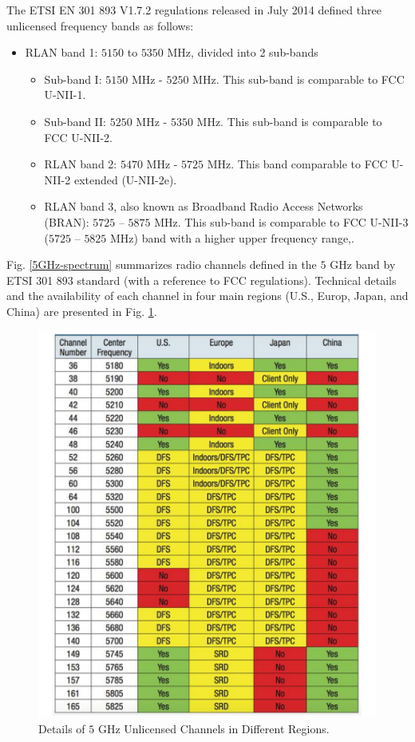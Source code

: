 The ETSI EN 301 893 V1.7.2 regulations \cite{LBT-ETSI-2014} released in July 2014 defined three unlicensed frequency bands as follows:
\begin{itemize}
\item
RLAN band 1: $5150$ to $5350$ MHz, divided into 2 sub-bands
\begin{itemize}
\item
Sub-band I: $5150$ MHz - $5250$ MHz. This sub-band is comparable to FCC U-NII-1. 
\item
Sub-band II: $5250$ MHz - $5350$ MHz. This sub-band is comparable to FCC U-NII-2.
\item
RLAN band 2: $5470$ MHz - $5725$ MHz. This band comparable to FCC U-NII-2 extended (U-NII-2e).
\item
RLAN band 3, also known as Broadband Radio Access Networks (BRAN): $5725$ – $5875$ MHz. This sub-band is comparable to FCC U-NII-3 ($5725$ – $5825$ MHz) band with a higher upper frequency range,.
\end{itemize}
\end{itemize}

Fig. \ref{5GHz-spectrum} summarizes radio channels defined in the $5$ GHz band by ETSI 301 893 standard (with a reference to FCC regulations). Technical details and the availability of each channel in four main regions (U.S., Europ, Japan, and China) are presented in Fig. \ref{figs:5GHz-spectrum-table}.

\begin{figure}[!t]
	\centering
	\includegraphics[width=0.85\columnwidth]{figs/5GHz-spectrum-table.pdf}
	\caption{Details of $5$ GHz Unlicensed Channels in Different Regions.}
	\label{figs:5GHz-spectrum-table}
\end{figure}



